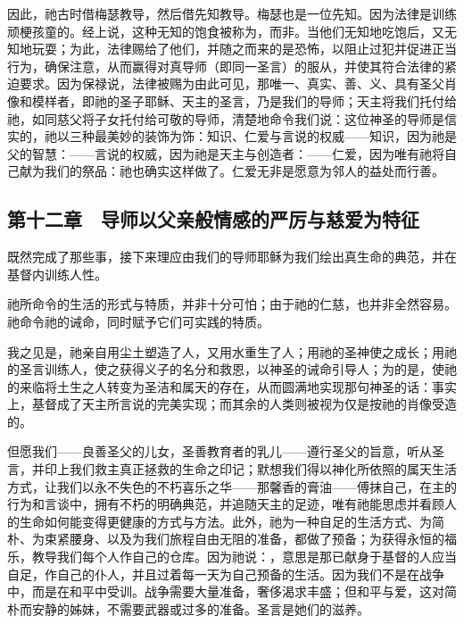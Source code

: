 因此，祂古时借梅瑟教导，然后借先知教导。梅瑟也是一位先知。因为法律是训练顽梗孩童的。经上说，这种无知的饱食被称为，而非。当他们无知地吃饱后，又无知地玩耍；为此，法律赐给了他们，并随之而来的是恐怖，以阻止过犯并促进正当行为，确保注意，从而赢得对真导师（即同一圣言）的服从，并使其符合法律的紧迫要求。因为保禄说，法律被赐为由此可见，那唯一、真实、善、义、具有圣父肖像和模样者，即祂的圣子耶稣、天主的圣言，乃是我们的导师；天主将我们托付给祂，如同慈父将子女托付给可敬的导师，清楚地命令我们说：这位神圣的导师是信实的，祂以三种最美妙的装饰为饰：知识、仁爱与言说的权威——知识，因为祂是父的智慧：——言说的权威，因为祂是天主与创造者：——仁爱，因为唯有祂将自己献为我们的祭品：祂也确实这样做了。仁爱无非是愿意为邻人的益处而行善。\par


\subsection{第十二章　导师以父亲般情感的严厉与慈爱为特征}

既然完成了那些事，接下来理应由我们的导师耶稣为我们绘出真生命的典范，并在基督内训练人性。\par

祂所命令的生活的形式与特质，并非十分可怕；由于祂的仁慈，也并非全然容易。祂命令祂的诫命，同时赋予它们可实践的特质。\par

我之见是，祂亲自用尘土塑造了人，又用水重生了人；用祂的圣神使之成长；用祂的圣言训练人，使之获得义子的名分和救恩，以神圣的诫命引导人；为的是，使祂的来临将土生之人转变为圣洁和属天的存在，从而圆满地实现那句神圣的话：事实上，基督成了天主所言说的完美实现；而其余的人类则被视为仅是按祂的肖像受造的。\par

但愿我们——良善圣父的儿女，圣善教育者的乳儿——遵行圣父的旨意，听从圣言，并印上我们救主真正拯救的生命之印记；默想我们得以神化所依照的属天生活方式，让我们以永不失色的不朽喜乐之华——那馨香的膏油——傅抹自己，在主的行为和言谈中，拥有不朽的明确典范，并追随天主的足迹，唯有祂能思虑并看顾人的生命如何能变得更健康的方式与方法。此外，祂为一种自足的生活方式、为简朴、为束紧腰身、以及为我们旅程自由无阻的准备，都做了预备；为获得永恒的福乐，教导我们每个人作自己的仓库。因为祂说：，意思是那已献身于基督的人应当自足，作自己的仆人，并且过着每一天为自己预备的生活。因为我们不是在战争中，而是在和平中受训。战争需要大量准备，奢侈渴求丰盛；但和平与爱，这对简朴而安静的姊妹，不需要武器或过多的准备。圣言是她们的滋养。\par

